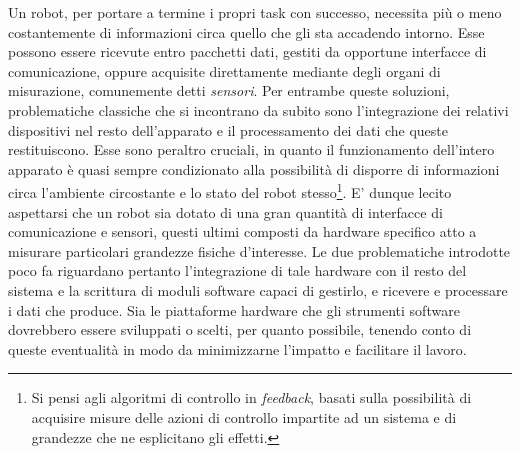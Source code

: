 \indent Un robot, per portare a termine i propri task con successo, necessita più o meno costantemente di informazioni circa quello che gli sta accadendo intorno. Esse possono essere ricevute entro pacchetti dati, gestiti da opportune interfacce di comunicazione, oppure acquisite direttamente mediante degli organi di misurazione, comunemente detti \emph{sensori}. Per entrambe queste soluzioni, problematiche classiche che si incontrano da subito sono l'integrazione dei relativi dispositivi nel resto dell'apparato e il processamento dei dati che queste restituiscono. Esse sono peraltro cruciali, in quanto il funzionamento dell'intero apparato è quasi sempre condizionato alla possibilità di disporre di informazioni circa l'ambiente circostante e lo stato del robot stesso\footnote{Si pensi agli algoritmi di controllo in \emph{feedback}, basati sulla possibilità di acquisire misure delle azioni di controllo impartite ad un sistema e di grandezze che ne esplicitano gli effetti.}. E' dunque lecito aspettarsi che un robot sia dotato di una gran quantità di interfacce di comunicazione e sensori, questi ultimi composti da hardware specifico atto a misurare particolari grandezze fisiche d'interesse. Le due problematiche introdotte poco fa riguardano pertanto l'integrazione di tale hardware con il resto del sistema e la scrittura di moduli software capaci di gestirlo, e ricevere e processare i dati che produce. Sia le piattaforme hardware che gli strumenti software dovrebbero essere sviluppati o scelti, per quanto possibile, tenendo conto di queste eventualità in modo da minimizzarne l'impatto e facilitare il lavoro.

